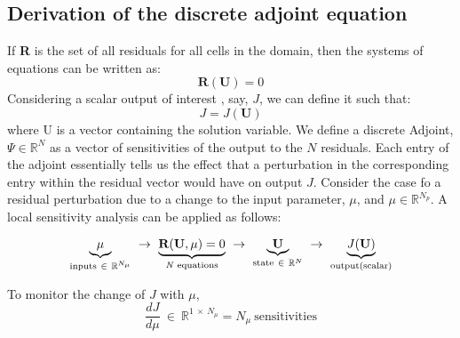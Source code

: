 \subsection{Derivation of the discrete adjoint equation} \label{subsection:DerivAdj}
If \textbf{R} is the set of all residuals for all cells in the domain, then the systems of equations can be written as:
\begin{equation}
\textbf{R}(\textbf{U}) = 0
\end{equation}
Considering a scalar output of interest \cite{Fidkowski:2013}, say, $J$, we can define it such that:
\begin{equation}
J = J(\mathbf{U})
\end{equation}
where U is a vector containing the solution variable. We define a discrete Adjoint, $\Psi \in \mathbb{R}^N$ as a vector of sensitivities of the output to the $N$ residuals. Each entry of the adjoint essentially tells us the effect that a perturbation in the corresponding entry within the residual vector would have on output $J$. Consider the case fo a residual perturbation due to a change to the input parameter, $\mu$, and $\mu \in \mathbb{R}^{N_p}$. A local sensitivity analysis can be applied as follows:\par
\begin{equation} \label{eqn:chain}
\underbrace{\mu}_{\text{inputs} ~\in~\mathbb{R}^{N_\mu}} ~\to~ \underbrace{\textbf{R}(\textbf{U},\textbf{$\mu$}) = 0}_{\text{\textit{N} equations}} ~ \to ~ \underbrace{\textbf{U}}_{\text{state} ~\in~ \mathbb{R}^N} ~\to~ \underbrace{\text{\textit{J}(\textbf{U})}}_\text{output(scalar)} 
\end{equation}

To monitor the change of $J$ with $\mu$,
\begin{equation}
\frac{dJ}{d\mu} ~\in~ \mathbb{R}^{1~\times~N_{\mu}} = N_\mu ~ \text{sensitivities}
\end{equation}

